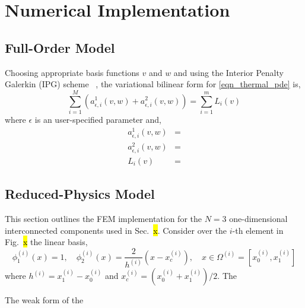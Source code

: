 \appendix

\section{Numerical Implementation}\label{app_implementation}

\subsection{Full-Order Model}

Choosing appropriate basis functions $v$ and $w$ and using the Interior Penalty Galerkin (IPG) scheme ~\cite{Cohen and pernet 2018}, the variational bilinear form for \cref{eqn_thermal_pde} is,
\begin{equation}
    \sum_{i=1}^{M}\left(a^{1}_{\epsilon,i}(v,w) + a^{2}_{\epsilon,i}(v,w)\right) = \sum_{i=1}^{m}L_i(v)
\end{equation}
where $\epsilon$ is an user-specified parameter and,
\begin{subequations}
    \begin{align}
        a^{1}_{\epsilon,i}(v,w) &=\\
        a^{2}_{\epsilon,i}(v,w) &=\\
        L_i(v) &=
    \end{align}
\end{subequations}

\subsection{Reduced-Physics Model}

This section outlines the FEM implementation for the $N=3$ one-dimensional interconnected components used in Sec.~\hl{x}. Consider over the $i$-th element in Fig.~\hl{x} the linear basis,
\[
    \phi^{(i)}_1(x) = 1,\quad \phi^{(i)}_2(x) = \frac{2}{h^{(i)}}\left(x - x_c^{(i)}\right),\quad x\in\Omega^{(i)} = \left[x_0^{(i)},x_1^{(i)}\right]
\]
where $h^{(i)} = x_1^{(i)} - x_0^{(i)}$ and $x^{(i)}_c = (x^{(i)}_0 + x^{(i)}_1) / 2$. The 

The weak form of the 


